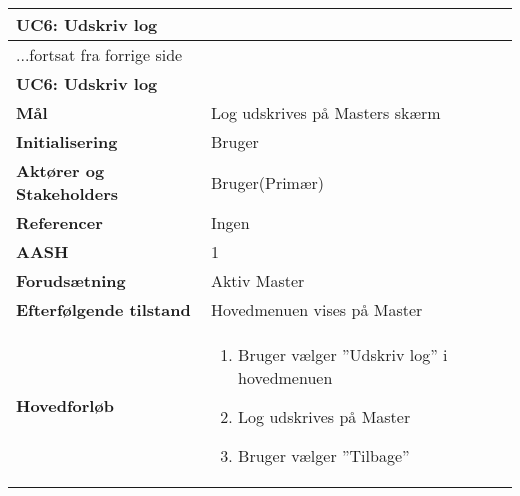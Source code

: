 \begin{center} \centering \label{UC6}
	\begin{longtable}{|p{5cm}|p{9cm}|}  %
	\hline
		\multicolumn{2}{|l|}{\textbf{UC6: Udskriv log}} \\\hline %
		\endfirsthead
		
		\multicolumn{2}{l}{...fortsat fra forrige side} \\ \hline %
		\multicolumn{2}{|l|}{\textbf{UC6: Udskriv log}} \\\hline %
		\endhead	
		
		\textbf{Mål}								&Log udskrives på Masters skærm	\\\hline
		\textbf{Initialisering}					&Bruger 					\\\hline
		\textbf{Aktører og Stakeholders}			&Bruger(Primær)			\\\hline
		\textbf{Referencer}						&Ingen					\\\hline
		\textbf{AASH}							&1						\\\hline
		\textbf{Forudsætning}					&Aktiv Master		\\\hline
		\textbf{Efterfølgende tilstand}			&Hovedmenuen vises på Master	\\\hline
		\textbf{Hovedforløb}					
			&\begin{enumerate}
	
				\item Bruger vælger ''Udskriv log'' i hovedmenuen 
				
				\item Log udskrives på Master
				
				\item Bruger vælger ''Tilbage''
	
			\end{enumerate}\\\hline
	\end{longtable} 
\end{center}


